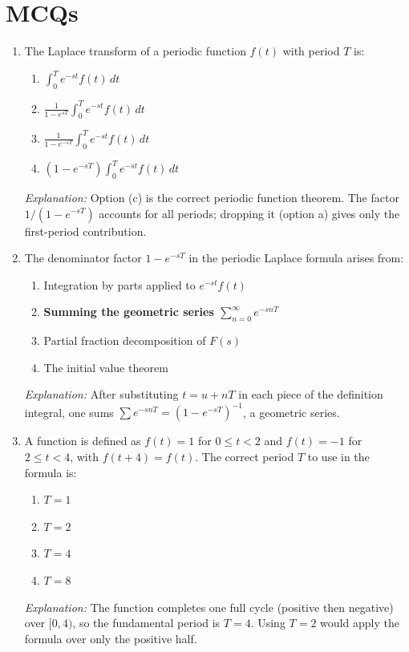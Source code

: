 \documentclass[12pt,a4paper]{article}
\begin{document}
\section{MCQs}

\begin{enumerate}[label=\textbf{MCQ \arabic*.}, leftmargin=*, itemsep=12pt]

\item The Laplace transform of a periodic function $f(t)$ with period $T$ is:
\begin{enumerate}[label=(\alph*)]
  \item $\displaystyle\int_0^T e^{-st}f(t)\,dt$
  \item $\displaystyle\frac{1}{1-e^{sT}}\int_0^T e^{-st}f(t)\,dt$
  \item \textbf{$\displaystyle\frac{1}{1-e^{-sT}}\int_0^T e^{-st}f(t)\,dt$}
  \item $\displaystyle(1-e^{-sT})\int_0^T e^{-st}f(t)\,dt$
\end{enumerate}
\textit{Explanation:} Option (c) is the correct periodic function theorem.  The factor $1/(1-e^{-sT})$ accounts for all periods; dropping it (option a) gives only the first-period contribution.

\item The denominator factor $1-e^{-sT}$ in the periodic Laplace formula
arises from:
\begin{enumerate}[label=(\alph*)]
  \item Integration by parts applied to $e^{-st}f(t)$
  \item \textbf{Summing the geometric series $\sum_{n=0}^\infty e^{-snT}$}
  \item Partial fraction decomposition of $F(s)$
  \item The initial value theorem
\end{enumerate}
\textit{Explanation:} After substituting $t = u+nT$ in each piece of the definition integral, one sums $\sum e^{-snT}=(1-e^{-sT})^{-1}$, a geometric series.

\item A function is defined as $f(t) = 1$ for $0 \leq t < 2$ and
$f(t) = -1$ for $2 \leq t < 4$, with $f(t+4) = f(t)$.  The correct period
$T$ to use in the formula is:
\begin{enumerate}[label=(\alph*)]
  \item $T = 1$
  \item $T = 2$
  \item \textbf{$T = 4$}
  \item $T = 8$
\end{enumerate}
\textit{Explanation:} The function completes one full cycle (positive then negative) over $[0,4)$, so the fundamental period is $T=4$.  Using $T=2$ would apply the formula over only the positive half.


\end{enumerate}
\end{document}
